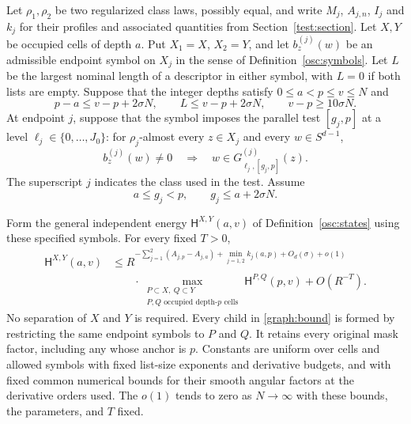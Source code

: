 \begin{proposition}
\label{graph:estimate}
Let $\rho_1,\rho_2$ be two regularized class laws, possibly equal, and
write $M_j$, $A_{j,n}$, $I_j$ and $k_j$ for their profiles and associated
quantities from Section~\ref{test:section}.  Let $X,Y$ be occupied
cells of depth $a$.  Put $X_1=X$, $X_2=Y$, and let
$b^{(j)}_z(w)$ be an admissible endpoint symbol on $X_j$ in the sense
of Definition~\ref{osc:symbols}.  Let $L$ be the largest nominal
length of a descriptor in either symbol, with $L=0$ if both lists are
empty.  Suppose that the integer depths satisfy $0\le a<p\le v\le N$
and
\begin{equation}\label{graph:range}
 p-a\le v-p+2\sigma N,\qquad
 L\le v-p+2\sigma N,\qquad v-p\ge10\sigma N.
\end{equation}
At endpoint $j$, suppose that the symbol imposes the parallel test
$[g_j,p]$ at a level $\ell_j\in\{0,\ldots,J_0\}$: for
$\rho_j$-almost every $z\in X_j$ and every $w\in S^{d-1}$,
\begin{equation}\label{graph:support-test}
 b^{(j)}_z(w)\ne0
 \quad\Longrightarrow\quad
 w\in G^{(j)}_{\ell_j,[g_j,p]}(z).
\end{equation}
The superscript $j$ indicates the class used in the test.  Assume
\begin{equation}\label{graph:anchor-range}
 a\le g_j<p,\qquad g_j\le a+2\sigma N.
\end{equation}

Form the general independent energy $\mathsf H^{X,Y}(a,v)$ of
Definition~\ref{osc:states} using these specified symbols.  For every
fixed $T>0$,
\begin{equation}\label{graph:bound}
 \begin{split}
 \mathsf H^{X,Y}(a,v)
 &\le
 R^{-\sum_{j=1}^2(A_{j,p}-A_{j,a})
       +\min_{j=1,2}k_j(a,p)+O_d(\sigma)+o(1)}\\
 &\qquad\cdot
 \max_{\substack{P\subset X,\ Q\subset Y\\
                   P,Q\text{ occupied depth-}p\text{ cells}}}
       \mathsf H^{P,Q}(p,v)
 +O(R^{-T}).
 \end{split}
\end{equation}
No separation of $X$ and $Y$ is required.  Every child in
\eqref{graph:bound} is formed by restricting the same endpoint symbols
to $P$ and $Q$.  It retains every original mask factor, including any
whose anchor is $p$.  Constants are uniform over cells and allowed
symbols with fixed list-size exponents and derivative budgets, and with
fixed common numerical bounds for their smooth angular factors at the
derivative orders used.  The $o(1)$ tends to zero as $N\to\infty$ with
these bounds, the parameters, and $T$ fixed.
\end{proposition}

